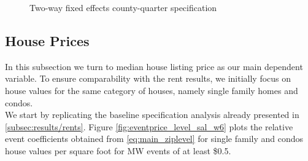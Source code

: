 \begin{figure}[h!]
    \centering
    \caption{Two-way fixed effects county-quarter specification}
    \label{fig:event_level_county2way}
\end{figure}

\subsection{House Prices}\label{subsec:results/prices}
In this subsection we turn to median house listing price as our main dependent variable. To ensure comparability with the rent results, we initially focus on house values for the same category of houses, namely single family homes and condos.\\

We start by replicating the baseline specification analysis already presented in \autoref{subsec:results/rents}. Figure \ref{fig:eventprice_level_sal_w6} plots the relative event coefficients obtained from \autoref{eq:main_ziplevel} for single family and condos house values per square foot for MW events of at least \$0.5. 

